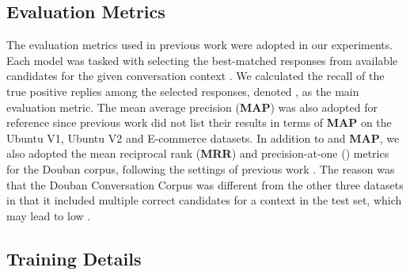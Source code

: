 \documentclass[journal]{IEEEtran}
\begin{document}
  \subsection{Evaluation Metrics}
  The evaluation metrics  used in previous work \cite{DBLP:conf/sigdial/LowePSP15,DBLP:journals/dad/LowePSCLP17,DBLP:conf/acl/WuWXZL17,DBLP:conf/coling/ZhangLZZL18} were adopted in our experiments.
  Each model was tasked with selecting the  best-matched responses from  available candidates for the given conversation context .
  We calculated the recall of the true positive replies among the  selected responses, denoted , as the main evaluation metric.
  The mean average precision (\textbf{MAP}) \cite{DBLP:books/aw/Baeza-YatesR99} was also adopted for reference since previous work did not list their results in terms of \textbf{MAP} on the Ubuntu V1, Ubuntu V2 and E-commerce datasets.
  In addition to  and \textbf{MAP}, we also adopted the mean reciprocal rank (\textbf{MRR}) \cite{DBLP:conf/trec/Voorhees99} and precision-at-one () metrics for the Douban corpus, following the settings of previous work \cite{DBLP:conf/acl/WuWXZL17}.
  The reason was that the Douban Conversation Corpus was different from the other three datasets in that it included multiple correct candidates for a context in the test set, which may lead to low .

  \subsection{Training Details}
\end{document}
